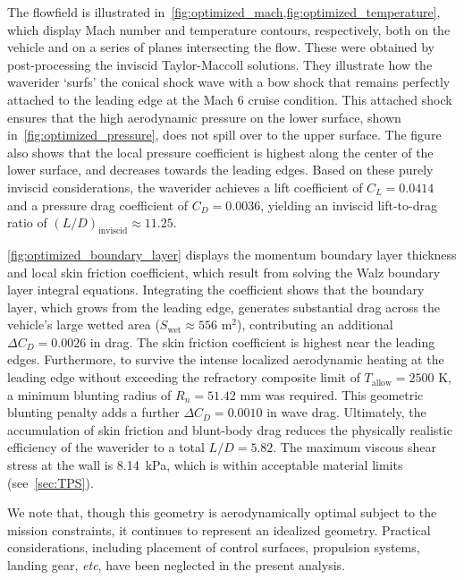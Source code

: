 \documentclass[10pt,a4paper]{article}
\begin{document}
The flowfield is illustrated in~\cref{fig:optimized_mach,fig:optimized_temperature}, which display Mach number and temperature contours, respectively, both on the vehicle and on a series of planes intersecting the flow. These were obtained by post-processing the inviscid Taylor-Maccoll solutions. They illustrate how the waverider `surfs' the conical shock wave with a bow shock that remains perfectly attached to the leading edge at the Mach 6 cruise condition. This attached shock ensures that the high aerodynamic pressure on the lower surface, shown in~\cref{fig:optimized_pressure}, does not spill over to the upper surface. The figure also shows that the local pressure coefficient is highest along the center of the lower surface, and decreases towards the leading edges. Based on these purely inviscid considerations, the waverider achieves a lift coefficient of $C_L = 0.0414$ and a pressure drag coefficient of $C_D = 0.0036$, yielding an inviscid lift-to-drag ratio of ${(L/D)}_\text{inviscid}\approx11.25$.

\cref{fig:optimized_boundary_layer} displays the momentum boundary layer thickness and local skin friction coefficient, which result from solving the Walz boundary layer integral equations. Integrating the coefficient shows that the boundary layer, which grows from the leading edge, generates substantial drag across the vehicle's large wetted area ($S_{\text{wet}} \approx 556$ m$^2$), contributing an additional $\Delta C_D = 0.0026$ in drag. The skin friction coefficient is highest near the leading edges. Furthermore, to survive the intense localized aerodynamic heating at the leading edge without exceeding the refractory composite limit of $T_{\text{allow}} = 2500$ K, a minimum blunting radius of $R_n = 51.42$ mm was required. This geometric blunting penalty adds a further $\Delta C_D = 0.0010$ in wave drag. Ultimately, the accumulation of skin friction and blunt-body drag reduces the physically realistic efficiency of the waverider to a total $L/D = 5.82$. The maximum viscous shear stress at the wall is 8.14~kPa, which is within acceptable material limits (see~\cref{sec:TPS}). 

We note that, though this geometry is aerodynamically optimal subject to the mission constraints, it continues to represent an idealized geometry. Practical considerations, including placement of control surfaces, propulsion systems, landing gear, \textit{etc}, have been neglected in the present analysis.


\end{document}

